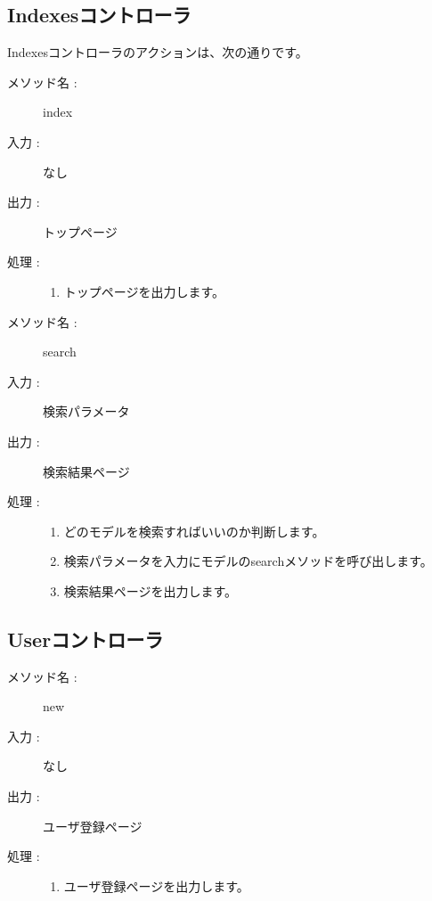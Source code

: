 \documentclass[a4j,titlepage]{jarticle}
\begin{document}
\subsection{Indexesコントローラ}
Indexesコントローラのアクションは、次の通りです。

\begin{description}
\item [メソッド名 :] index
\item [入力 :] なし
\item [出力 :] トップページ
\item [処理 :]\mbox{}
  \begin{enumerate}
  \item トップページを出力します。
  \end{enumerate}
\end{description}

\begin{description}
\item [メソッド名 :] search
\item [入力 :] 検索パラメータ
\item [出力 :] 検索結果ページ
\item [処理 :]\mbox{}
  \begin{enumerate}
  \item どのモデルを検索すればいいのか判断します。
  \item 検索パラメータを入力にモデルのsearchメソッドを呼び出します。
  \item 検索結果ページを出力します。
  \end{enumerate}
\end{description}

\subsection{Userコントローラ}
\begin{description}
\item [メソッド名 :] new
\item [入力 :] なし
\item [出力 :] ユーザ登録ページ
\item [処理 :]\mbox{}
  \begin{enumerate}
 \item ユーザ登録ページを出力します。
 \end{enumerate}
\end{description}

\clearpage
\end{document}

